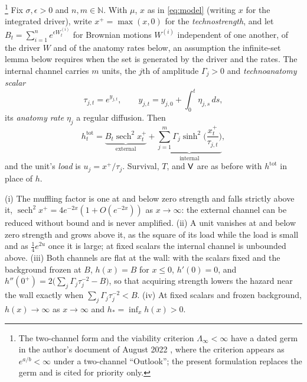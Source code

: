 \begin{definition}\label{def:twochannel}\footnote{The
two-channel form and the viability criterion $\Lambda_\infty<\infty$
have a dated germ in the author's document of August 2022
\cite{GoldenScience2022}, where the criterion appears as $e^{a/b}<\infty$
under a two-channel ``Outlook''; the present formulation replaces the
germ and is cited for priority only.}
Fix $\sigma,\epsilon>0$ and $n,m\in\mathbb N$. With $\mu$, $x$ as in
\eqref{eq:model} (writing $x$ for the integrated driver), write
$x^+=\max(x,0)$ for the \emph{technostrength}, and let
$B_t=\sum_{i=1}^n e^{\epsilon W^{(i)}_t}$ for Brownian motions
$W^{(i)}$ independent of one another, of the driver $W$ and of the
anatomy rates below, an assumption the infinite-set lemma below requires
when the set is generated by the driver and the rates. The internal
channel carries $m$ units, the $j$th of amplitude $\Gamma_j>0$ and
\emph{technoanatomy scalar}
\begin{equation}\label{eq:scalar}
\tau_{j,t}=e^{y_{j,t}},\qquad y_{j,t}=y_{j,0}+\int_0^t\eta_{j,s}\,ds,
\end{equation}
its \emph{anatomy rate} $\eta_j$ a regular diffusion. Then
\begin{equation}\label{eq:hazard}
h^{\mathrm{tot}}_t
=\underbrace{B_t\operatorname{sech}^2x_t^+}_{\text{external}}
+\underbrace{\sum_{j=1}^m\Gamma_j\sinh^2\!\Big(\frac{x_t^+}{\tau_{j,t}}\Big)}_{\text{internal}},
\end{equation}
and the unit's \emph{load} is $u_j=x^+/\tau_j$. Survival, $T$, and
$\mathsf{V}$ are as before with $h^{\mathrm{tot}}$ in place of $h$.
\end{definition}

\begin{proposition}
\label{prop:dominance}
(i) The muffling factor is one at and below zero strength and falls
strictly above it, $\operatorname{sech}^2x^+=4e^{-2x}(1+O(e^{-2x}))$ as
$x\to\infty$: the external channel can be reduced without bound and is
never amplified. (ii) A unit vanishes at and below zero strength and
grows above it, as the square of its load while the load is small and as
$\tfrac14e^{2u}$ once it is large; at fixed scalars the internal channel
is unbounded above. (iii) Both channels are flat at the wall: with the
scalars fixed and the background frozen at $B$, $h(x)=B$ for $x\le0$,
$h'(0)=0$, and $h''(0^+)=2\big(\sum_j\Gamma_j\tau_j^{-2}-B\big)$, so that
acquiring strength lowers the hazard near the wall exactly when
$\sum_j\Gamma_j\tau_j^{-2}<B$. (iv) At fixed scalars and frozen
background, $h(x)\to\infty$ as $x\to\infty$ and $h_\ast=\inf_xh(x)>0$.
\end{proposition}

